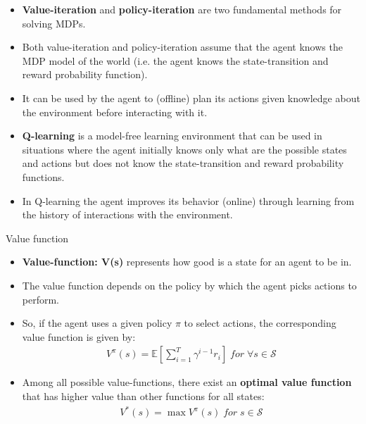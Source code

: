 \documentclass[10pt,mathserif]{beamer}
\begin{document}
\begin{frame}{}
\begin{itemize}
\item \textbf{Value-iteration} and \textbf{policy-iteration} are two fundamental methods for solving MDPs.
\item Both value-iteration and policy-iteration assume that the agent knows the MDP model of the world (i.e. the agent knows the state-transition and reward probability function).
\item It can be used by the agent to (offline) plan its actions given knowledge about the environment before interacting with it.
\item \textbf{Q-learning} is a model-free learning environment that can be used in situations where the agent initially knows only what are the possible states and actions but does not know the state-transition and reward probability functions.
\item In Q-learning the agent improves its behavior (online) through learning from the history of interactions with the environment.
\end{itemize}
\end{frame}


\begin{frame}{Value function}
\begin{itemize}
\item \textbf{Value-function: V(s)} represents how good is a state for an agent to be in.
\item The value function depends on the policy by which the agent picks actions to perform.
\item So, if the agent uses a given policy $\pi$ to select actions, the corresponding value function is given by:
\begin{align}
V^{\pi}(s) = \mathbb{E}\left[ \sum_{i=1}^T\gamma^{i-1}r_i\right] \; for \;\forall s\in \mathcal{S}
\end{align}
\item Among all possible value-functions, there exist an \textbf{optimal value function} that has higher value than other functions for all states:
\begin{align}
V^*(s) = \max V^{\pi}(s) \; for \; s\in\mathcal{S}
\end{align}
\end{itemize}
\end{frame}
\end{document}
